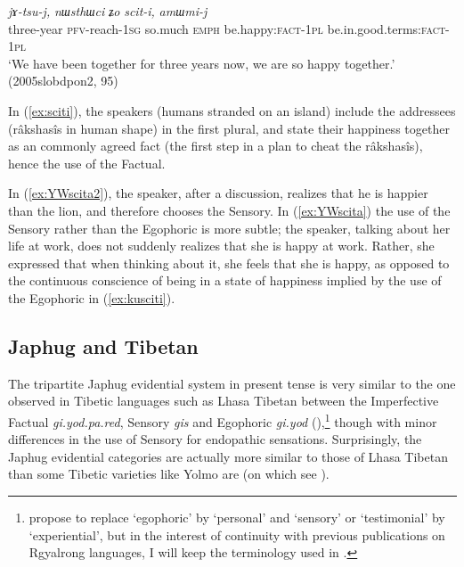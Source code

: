 \documentclass[11pt]{article}
\newcommand{\ipa}[1]{{\phon\textit{#1}}} %
\newcommand{\refb}[1]{(\ref{#1})}
\begin{document}
\begin{exe}
\ex \label{ex:sciti}
\gll \ipa{χsɯ-xpa} 	\ipa{jɤ-tsu-j,} 	\ipa{nɯsthɯci} 	\ipa{ʑo} \ipa{scit-i,} 	\ipa{amɯmi-j}  \\
three-year \textsc{pfv}-reach-\textsc{1sg} so.much \textsc{emph} be.happy:\textsc{fact-1pl} be.in.good.terms:\textsc{fact-1pl} \\
\glt `We have been together for three years now, we are so happy together.' (2005slobdpon2, 95)
\end{exe}

In \refb{ex:sciti}, the speakers (humans stranded on an island) include the addressees (râkshasîs in human shape) in the first plural, and state their happiness together as an commonly agreed fact (the first step in a plan to cheat the râkshasîs), hence the use of the Factual. 

In \refb{ex:YWscita2}, the speaker, after a discussion, realizes that he is happier than the lion, and therefore chooses the Sensory. In \refb{ex:YWscita} the use of the Sensory rather than the Egophoric is more subtle; the speaker, talking about her life at work, does not suddenly realizes that she is happy at work. Rather, she expressed that when thinking about it, she feels that she is happy, as opposed to the continuous conscience of being in a state of happiness implied by the use of the Egophoric in \refb{ex:kusciti}.


\subsection{Japhug and Tibetan}
The tripartite Japhug evidential system in present tense is very similar to the one observed in Tibetic languages such as Lhasa Tibetan between the Imperfective Factual \ipa{gi.yod.pa.red}, Sensory \textit{gis} and Egophoric \ipa{gi.yod} (\citealt[295+]{tournadre08conjunct}),\footnote{\citet{hill17evidential} propose to replace `egophoric' by ‘personal’ and `sensory' or `testimonial' by ‘experiential’, but in the interest of continuity with previous publications on Rgyalrong languages, I will keep the terminology used in \citet{jacques17sketch}. } though with minor differences in the use of Sensory for endopathic sensations. Surprisingly, the Japhug evidential categories are actually more similar to those of Lhasa Tibetan than some Tibetic varieties like Yolmo are (on which see \citealt{gawne13copulas}). 
 
\end{document}
